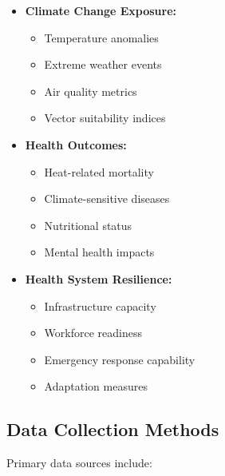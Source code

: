 \begin{itemize}
    \item \textbf{Climate Change Exposure:}
    \begin{itemize}
        \item Temperature anomalies
        \item Extreme weather events
        \item Air quality metrics
        \item Vector suitability indices
    \end{itemize}
    
    \item \textbf{Health Outcomes:}
    \begin{itemize}
        \item Heat-related mortality
        \item Climate-sensitive diseases
        \item Nutritional status
        \item Mental health impacts
    \end{itemize}
    
    \item \textbf{Health System Resilience:}
    \begin{itemize}
        \item Infrastructure capacity
        \item Workforce readiness
        \item Emergency response capability
        \item Adaptation measures
    \end{itemize}
\end{itemize}

\subsection{Data Collection Methods}
Primary data sources include:


